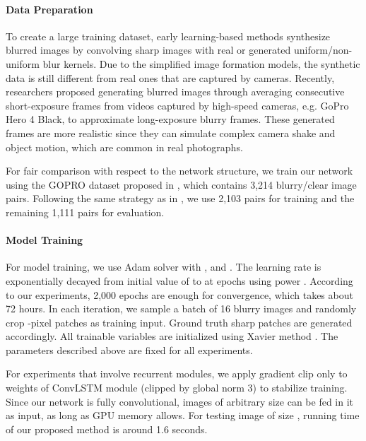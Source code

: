 \documentclass[10pt,twocolumn,letterpaper]{article}
\begin{document}
\vspace{-0.05in}
\paragraph{Data Preparation}
To create a large training dataset,
early learning-based methods \cite{chakrabarti2016neural,schuler2016learning,sun2015learning} synthesize blurred images by convolving sharp images with real or generated uniform/non-uniform blur kernels. Due to the simplified image formation models, the synthetic data is still different from real ones that are captured by cameras. Recently, researchers \cite{nah2017deep,su2017deep} proposed generating blurred images through averaging consecutive short-exposure frames from videos captured by high-speed cameras, e.g. GoPro Hero 4 Black, to approximate long-exposure blurry frames. These generated frames are more realistic since they can simulate complex camera shake and object motion, which are common in real photographs.

For fair comparison with respect to the network structure, we train our network using the GOPRO dataset proposed in \cite{nah2017deep}, which contains 3,214 blurry/clear image pairs. Following the same strategy as in \cite{nah2017deep}, we use 2,103 pairs for training and the remaining 1,111 pairs for evaluation.

\vspace{-0.05in}
\paragraph{Model Training}
For model training, we use Adam solver \cite{kingma2014adam} with ,  and . The learning rate is exponentially decayed from initial value of  to  at  epochs using power . According to our experiments, 2,000 epochs are enough for convergence, which takes about 72 hours. In each iteration, we sample a batch of 16 blurry images and randomly crop -pixel patches as training input. Ground truth sharp patches are generated accordingly. All trainable variables are initialized using Xavier method \cite{glorot2010understanding}. The parameters described above are fixed for all experiments. 

For experiments that involve recurrent modules, we apply gradient clip only to weights of ConvLSTM module (clipped by global norm 3) to stabilize training. Since our network is fully convolutional, images of arbitrary size can be fed in it as input, as long as GPU memory allows. For testing image of size , running time of our proposed method is around 1.6 seconds.
\end{document}
